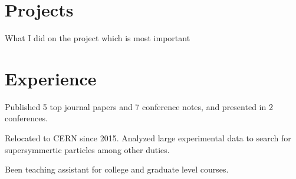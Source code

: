 \documentclass[letterpaper]{deedy-resume-openfont}
\begin{document}
\section{Projects}



\descript{}
\begin{tightemize}
\item What I did on the project which is most important
\end{tightemize}
\sectionsep


\section{Experience}

\begin{tightemize}
\item Published 5 top journal papers and 7 conference notes, and presented in 2 conferences.
\item Relocated to CERN since 2015. Analyzed large experimental data to search for supersymmertic particles among other duties.
\item Been teaching assistant for college and graduate level courses.

\end{tightemize}
\sectionsep
\end{document}
